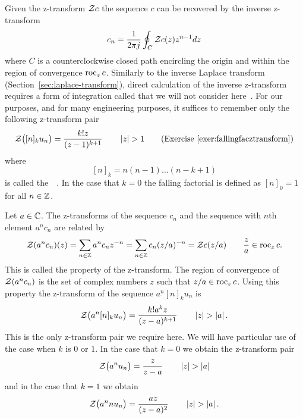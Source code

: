 \newcommand{\stirling}[2]{\genfrac{[}{]}{0pt}{}{#1}{#2}}
\newcommand{\eulerian}[2]{\genfrac{\langle}{\rangle}{0pt}{}{#1}{#2}}

Given the z-transform ${\mathcal Z} c$ the sequence $c$ can be recovered by the inverse z-transform
\[
c_n = \frac{1}{2\pi j} \oint_C {\mathcal Z} c(z) z^{n-1} dz
\]
where $C$ is a counterclockwise closed path encircling the origin and within the region of convergence $\operatorname{roc}_z c$.  Similarly to the inverse Laplace transform (Section~\ref{sec:laplace-transform}), direct calculation of the inverse z-transform requires a form of integration called  that we will not consider here~\citep{Stewart_ComplexAnalysis_2004}.  For our purposes, and for many engineering purposes, it suffices to remember only the following z-transform pair 
\[
{\mathcal Z}\big( [n]_k u_n \big) = \frac{k! z }{(z - 1)^{k+1}} \qquad \left\vert z \right\vert > 1 \qquad \text{(Exercise~\ref{exer:fallingfacztransform})}
\]
where
\[
[n]_k = n (n-1) \dots (n-k+1)
\]
is called the~~\cite[p.~48]{concretemath_1994}.  In the case that $k=0$ the falling factorial is defined as $[n]_0 = 1$ for all $n\in{\mathbb Z}$.  

Let $a \in {\mathbb C}$.  The z-transforms of the sequence $c_n$ and the sequence with $n$th element $a^nc_n$ are related by 
\[
{\mathcal Z}(a^n c_n)(z) = \sum_{n \in {\mathbb Z}} a^n c_n z^{-n} = \sum_{n \in {\mathbb Z}} c_n (z/a)^{-n} = {\mathcal Z} c(z/a) \qquad \frac{z}{a} \in \operatorname{roc}_z c.
\]
This is called the  property of the z-transform.  The region of convergence of ${\mathcal Z}(a^n c_n)$ is the set of complex numbers $z$ such that $z/a \in \operatorname{roc}_z c$.  Using this property the z-transform of the sequence $a^n [n]_k u_n$ is
\begin{equation}\label{eeq:onlyztrans}
{\mathcal Z}\big( a^n [n]_k u_n \big) = \frac{k! a^k z }{(z - a)^{k+1}} \qquad \left\vert z \right\vert > \left\vert a \right\vert.
\end{equation}
This is the only z-transform pair we require here.  We will have particular use of the case when $k$ is $0$ or $1$.  In the case that $k=0$ we obtain the z-transform pair
\[
{\mathcal Z}\big( a^n u_n \big) = \frac{ z }{z - a} \qquad \left\vert z \right\vert > \left\vert a \right\vert
\]
and in the case that $k=1$ we obtain
\[
{\mathcal Z}\big( a^n n u_n \big) = \frac{ a z }{(z - a)^{2}} \qquad \left\vert z \right\vert > \left\vert a \right\vert.
\]

